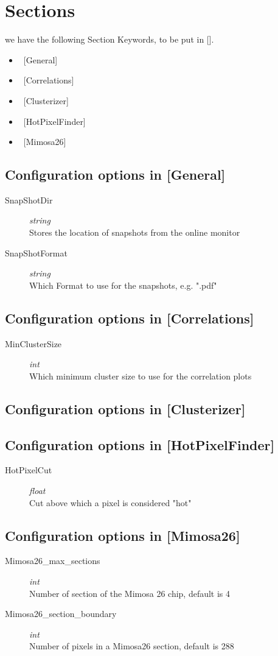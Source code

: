 \documentclass{article}
\begin{document}
\section{Sections}
we have the following Section Keywords, to be put in [].
\begin{itemize}
\item  ~[General]
\item ~[Correlations]
\item ~[Clusterizer]
\item ~[HotPixelFinder]
\item ~[Mimosa26]
\end{itemize}
\subsection{Configuration options in [General]} 
\begin{description}
\item[SnapShotDir] {\it string} \\Stores the location of snapshots from the online monitor
\item[SnapShotFormat] {\it string}\\ Which Format to use for the snapshots, e.g. ".pdf"
\end{description}
\subsection{Configuration options in [Correlations]}
\begin{description}
\item[MinClusterSize] {\it int} \\
Which minimum cluster size to use for the correlation plots  
\end{description}
\subsection{Configuration options in [Clusterizer]}
\subsection{Configuration options in [HotPixelFinder]}
\begin{description}
\item[HotPixelCut] {\it float} \\ Cut above which a pixel is considered "hot"
\end{description}
\subsection{Configuration options in [Mimosa26]}
\begin{description}
\item[Mimosa26\_max\_sections] {\it int} \\
Number of section of the Mimosa 26 chip, default is 4   
\item[Mimosa26\_section\_boundary] {\it int} \\ 
Number of pixels in a Mimosa26 section, default is 288
\end{description}
\end{document}
